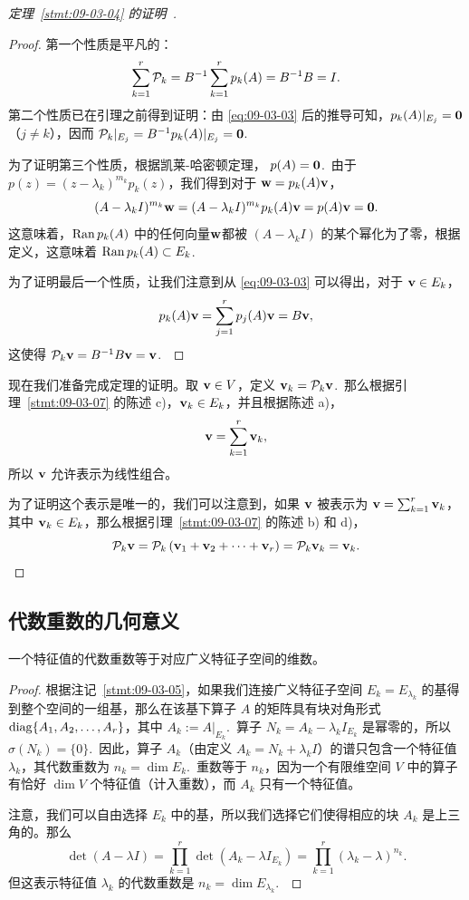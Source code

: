 \begin{proof}[\normalfont\heiti 定理~\ref{stmt:09-03-04} 的证明~\nopunct]
\begin{proof}第一个性质是平凡的：$$\sum_{k=1}^r \mathcal{P} _k = B^{-1} \sum_{k=1}^r p_k(A) = B^{-1} B = I.$$
第二个性质已在引理之前得到证明：由 \eqref{eq:09-03-03} 后的推导可知，$p_k(A)|_{E_j} = \mathbf{0}$（$j \neq k$），因而 $\mathcal{P} _k|_{E_j} = B^{-1}p_k(A)|_{E_j} = \mathbf{0}$.~

为了证明第三个性质，根据凯莱-哈密顿定理， $p(A) = \mathbf{0}$.~由于 $p(z) = (z - \lambda_k)^{m_k} p_k(z)$，我们得到对于 $\mathbf{w} = p_k(A)\mathbf{v}$，
$$(A - \lambda_k I)^{m_k} \mathbf{w} = (A - \lambda_k I)^{m_k} p_k(A) \mathbf{v} = p(A) \mathbf{v} = \mathbf{0}.$$
这意味着，$\operatorname{Ran} p_k(A)$ 中的任何向量$\mathbf{w}$都被 $(A - \lambda_k I)$ 的某个幂化为了零，根据定义，这意味着 $\operatorname{Ran} p_k(A) \subset E_k$.~

为了证明最后一个性质，让我们注意到从 \eqref{eq:09-03-03} 可以得出，对于 $\mathbf{v} \in E_k$，
$$p_k(A) \mathbf{v} = \sum_{j=1}^r p_j(A) \mathbf{v} = B \mathbf{v},$$
这使得 $\mathcal{P} _k \mathbf{v} = B^{-1} B \mathbf{v} = \mathbf{v}$.~\end{proof}

现在我们准备完成定理的证明。取 $\mathbf{v} \in V$，定义 $\mathbf{v}_k = \mathcal{P} _k \mathbf{v}$.~那么根据引理~\ref{stmt:09-03-07} 的陈述 c)，$\mathbf{v}_k \in E_k$，并且根据陈述 a)，
$$\mathbf{v} = \sum_{k=1}^r \mathbf{v}_k,$$
所以 $\mathbf{v}$ 允许表示为线性组合。

为了证明这个表示是唯一的，我们可以注意到，如果 $\mathbf{v}$ 被表示为 $\mathbf{v} = \sum_{k=1}^r \mathbf{v}_k$，其中 $\mathbf{v}_k \in E_k$，那么根据引理~\ref{stmt:09-03-07} 的陈述 b) 和 d)，
$$\mathcal{P} _k \mathbf{v} = \mathcal{P} _k \left( \mathbf{v}_1 + \mathbf{v}_2 + \dots + \mathbf{v}_r \right) = \mathcal{P} _k \mathbf{v}_k = \mathbf{v}_k.$$\end{proof}

\subsection{代数重数的几何意义}\label{sec:09-03-03}

\begin{proposition}\label{stmt:09-03-08}
一个特征值的代数重数等于对应广义特征子空间的维数。
\end{proposition}

\begin{proof}根据注记~\ref{stmt:09-03-05}，如果我们连接广义特征子空间 $E_k = E_{\lambda_k}$ 的基得到整个空间的一组基，那么在该基下算子 $A$ 的矩阵具有块对角形式 $\operatorname{diag}\{A_1, A_2, \dots, A_r\}$，其中 $A_k := A|_{E_k}$.~算子 $N_k = A_k - \lambda_k I_{E_k}$ 是幂零的，所以 $\sigma(N_k) = \{0\}$.~因此，算子 $A_k$（由定义 $A_k = N_k + \lambda_k I$）的谱只包含一个特征值 $\lambda_k$，其代数重数为 $n_k = \dim E_k$.~重数等于 $n_k$，因为一个有限维空间 $V$ 中的算子有恰好 $\dim V$ 个特征值（计入重数），而 $A_k$ 只有一个特征值。

注意，我们可以自由选择 $E_k$ 中的基，所以我们选择它们使得相应的块 $A_k$ 是上三角的。那么
$$\det(A - \lambda I) = \prod_{k=1}^r \det(A_k - \lambda I_{E_k}) = \prod_{k=1}^r (\lambda_k - \lambda)^{n_k}.$$
但这表示特征值 $\lambda_k$ 的代数重数是 $n_k = \dim E_{\lambda_k}$.~\end{proof}

